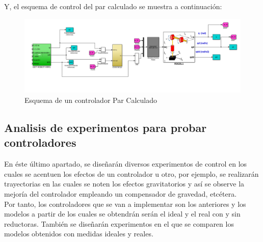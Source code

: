 	Y, el esquema de control del par calculado se muestra a continuación:

		\begin{figure}[h!]
			\centering
			\includegraphics[width=.8\textwidth]{montaje_parcalcul}
			\caption{Esquema de un controlador Par Calculado}
		\end{figure}

\newpage
	\subsection{Analisis de experimentos para probar controladores}
En éste último apartado, se diseñarán diversos experimentos de control en los cuales se acentuen los efectos de un controlador u otro, por ejemplo, se realizarán trayectorias en las cuales se noten los efectos gravitatorios y así se observe la mejoría del controlador empleando un compensador de gravedad, etcétera.\\
Por tanto, los controladores que se van a implementar son los anteriores y los modelos a partir de los cuales se obtendrán serán el ideal y el real con y sin reductoras. También se diseñarán experimentos en el que se comparen los modelos obtenidos con medidas ideales y reales.\\

